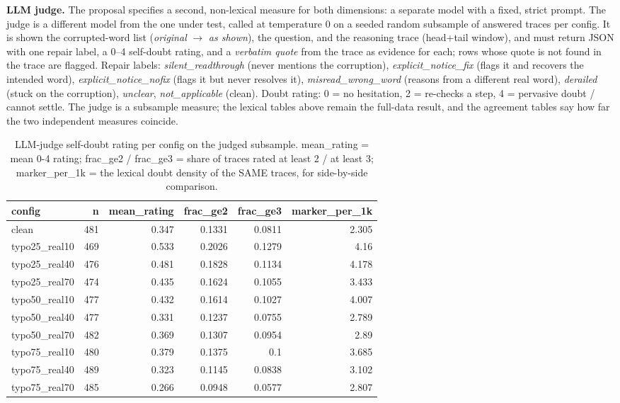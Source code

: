 \documentclass[11pt]{article}
\begin{document}
\noindent\textbf{LLM judge.} The proposal specifies a second,
non-lexical measure for both dimensions: a separate model with a fixed, strict prompt.
The judge is a different model from the one under test, called at temperature 0 on a
seeded random subsample of answered traces per config. It is shown the corrupted-word
list (\emph{original} $\to$ \emph{as shown}), the question, and the reasoning trace
(head+tail window), and must return JSON with one repair label, a 0--4 self-doubt
rating, and a \emph{verbatim quote} from the trace as evidence for each; rows whose
quote is not found in the trace are flagged. Repair labels:
\emph{silent\_readthrough} (never mentions the corruption),
\emph{explicit\_notice\_fix} (flags it and recovers the intended word),
\emph{explicit\_notice\_nofix} (flags it but never resolves it),
\emph{misread\_wrong\_word} (reasons from a different real word),
\emph{derailed} (stuck on the corruption), \emph{unclear}, \emph{not\_applicable} (clean).
Doubt rating: 0 = no hesitation, 2 = re-checks a step, 4 = pervasive doubt / cannot settle.
The judge is a subsample measure; the lexical tables above remain the full-data result,
and the agreement tables say how far the two independent measures coincide.
\medskip

\begin{table}[H]
\centering
\caption{LLM-judge self-doubt rating per config on the judged subsample. mean\_rating = mean 0-4 rating; frac\_ge2 / frac\_ge3 = share of traces rated at least 2 / at least 3; marker\_per\_1k = the lexical doubt density of the SAME traces, for side-by-side comparison.}
\small
\begin{adjustbox}{max width=\textwidth}
\begin{tabular}{lrrrrr}
\toprule
\textbf{config} & \textbf{n} & \textbf{mean\_rating} & \textbf{frac\_ge2} & \textbf{frac\_ge3} & \textbf{marker\_per\_1k} \\
\midrule
clean & 481 & 0.347 & 0.1331 & 0.0811 & 2.305 \\
typo25\_real10 & 469 & 0.533 & 0.2026 & 0.1279 & 4.16 \\
typo25\_real40 & 476 & 0.481 & 0.1828 & 0.1134 & 4.178 \\
typo25\_real70 & 474 & 0.435 & 0.1624 & 0.1055 & 3.433 \\
typo50\_real10 & 477 & 0.432 & 0.1614 & 0.1027 & 4.007 \\
typo50\_real40 & 477 & 0.331 & 0.1237 & 0.0755 & 2.789 \\
typo50\_real70 & 482 & 0.369 & 0.1307 & 0.0954 & 2.89 \\
typo75\_real10 & 480 & 0.379 & 0.1375 & 0.1 & 3.685 \\
typo75\_real40 & 489 & 0.323 & 0.1145 & 0.0838 & 3.102 \\
typo75\_real70 & 485 & 0.266 & 0.0948 & 0.0577 & 2.807 \\
\bottomrule
\end{tabular}
\end{adjustbox}
\end{table}
\end{document}
